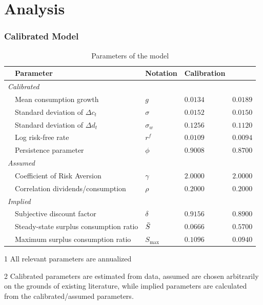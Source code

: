 \section{Analysis} \label{sec:Analysis}

\subsubsection{Calibrated Model}

\begin{table}[H]
\center
\begin{threeparttable}[b]
\caption{Parameters of the model}
\label{tab:ModelCalib}
\begin{tabular}{@{}llllc@{}}
\toprule
 & Parameter                              & Notation         & Calibration     & \citet{Campbell1999}\\ \midrule 
\multicolumn{5}{l}{\textit{Calibrated}}                                    \\
 & Mean consumption growth                & $g$              & $0.0134$  & $0.0189$\\
 & Standard deviation of $\Delta c_t$     & $\sigma$         & $0.0152$  & $0.0150$\\
 & Standard deviation of $\Delta d_t$     & $\sigma_w$       & $0.1256$  & $0.1120$\\
 & Log risk-free rate                     & $r^f$            & $0.0109$  & $0.0094$\\
 & Persistence parameter                  & $\phi$           & $0.9008$  & $0.8700$\\
 \multicolumn{5}{l}{\textit{Assumed}}                                      \\
 & Coefficient of Risk Aversion           & $\gamma$         & $2.0000$  & $2.0000$\\
 & Correlation dividends/consumption      & $\rho$           & $0.2000$  & $0.2000$\\
\multicolumn{5}{l}{\textit{Implied}}                                       \\
 & Subjective discount factor             & $\delta$         & $0.9156$  & $0.8900$\\
 & Steady-state surplus consumption ratio & $\Bar{S}$        & $0.0666$  & $0.5700$\\
 & Maximum surplus consumption ratio      & $S_{\text{max}}$ & $0.1096$  & $0.0940$\\ \bottomrule
\end{tabular}
\begin{tablenotes}
\footnotesize{\item [1] All relevant parameters are annualized
              \item [2] Calibrated parameters are estimated from data, assumed are chosen arbitrarily on the grounds of existing literature, while implied parameters are calculated from the calibrated/assumed parameters.}
\end{tablenotes}
\end{threeparttable}
\end{table}


